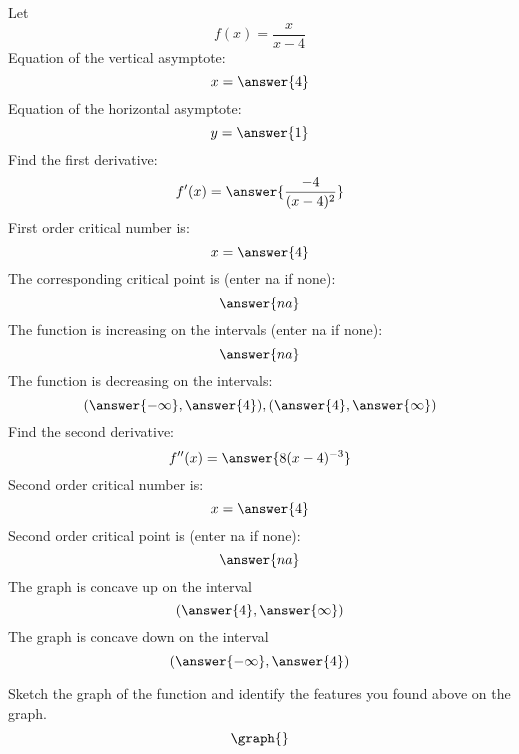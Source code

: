 \documentclass{ximera}
\begin{document}
\begin{problem}\label{prob:240HW7prob4}
Let $$f(x)=\frac{x}{x-4}$$
Equation of the vertical asymptote:
$$x=\answer{4}$$
Equation of the horizontal asymptote:
$$y=\answer{1}$$
Find the first derivative:
$$f'(x)=\answer{\frac{-4}{(x-4)^2}}$$
First order critical number is:
$$x=\answer{4}$$
The corresponding critical point is (enter na if none):
$$\answer{na}$$
The function is increasing on the intervals (enter na if none):
$$\answer{na}$$
The function is decreasing on the intervals:
$$(\answer{-\infty}, \answer{4}), (\answer{4},\answer{\infty})$$
Find the second derivative:
$$f''(x)=\answer{8(x-4)^{-3}}$$
Second order critical number is:
$$x=\answer{4}$$
Second order critical point is (enter na if none):
$$\answer{na}$$
The graph is concave up on the interval
$$(\answer{4}, \answer{\infty})$$
The graph is concave down on the interval
$$(\answer{-\infty}, \answer{4})$$

Sketch the graph of the function and identify the features you found above on the graph.
\[
\graph{}
\]
\end{problem}


 
\end{document}
